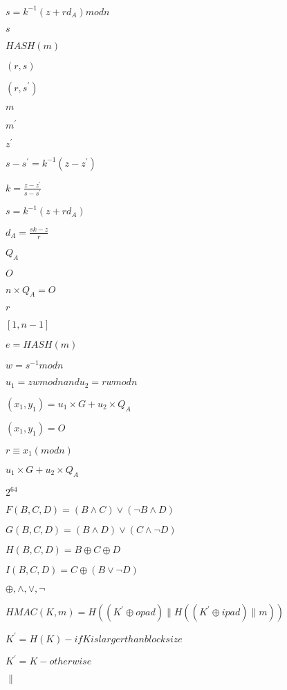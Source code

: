 \documentclass{article}
\begin{document}
$ s = {k}^{-1} ( z + rd_A ) mod n $
\pagebreak

$ s$
\pagebreak

$ HASH(m)$
\pagebreak

$ (r,s)$
\pagebreak

$ (r, {s}^{'})$
\pagebreak

$ m$
\pagebreak

$ {m}^{'}$
\pagebreak

$ {z}^{'}$
\pagebreak

$ s - {s}^{'} = {k}^{-1}(z - {z}^{'})$
\pagebreak

$ k = \frac{z - {z}^{'}}{s - {s}^{'}}$
\pagebreak

$ s = {k}^{-1}(z + rd_A)$
\pagebreak

$ d_A = \frac{sk - z}{r}$
\pagebreak

$ Q_A$
\pagebreak

$ O$
\pagebreak

$ n \times Q_A = O$
\pagebreak

$ r$
\pagebreak

$ [1, n - 1]$
\pagebreak

$ e = HASH (m)$
\pagebreak

$ w = {s}^{-1} mod n$
\pagebreak

$ u_1 = zw mod n and u_2 = rw mod n$
\pagebreak

$ (x_1, y_1) = u_1 \times G + u_2 \times Q_A$
\pagebreak

$ (x_1, y_1) = O$
\pagebreak

$ r \equiv x_1 ( mod n )$
\pagebreak

$ u_1 \times G + u_2 \times Q_A$
\pagebreak

$ {2}^{64} $
\pagebreak

$ F(B, C, D) = (B \wedge C) \vee (\neg B \wedge D) $
\pagebreak

$ G(B, C, D) = (B \wedge D) \vee (C \wedge \neg D) $
\pagebreak

$ H(B, C, D) = B \oplus C \oplus D $
\pagebreak

$ I(B, C, D) = C \oplus (B \vee \neg D) $
\pagebreak

$ \oplus, \wedge, \vee, \neg $
\pagebreak

$ HMAC(K,m) = H(({K}^{'}\oplus opad) \parallel H(({K}^{'}\oplus ipad) \parallel m)) $
\pagebreak

$ {K}^{'} = H(K) - if K is larger than block size$
\pagebreak

$ {K}^{'} = K - otherwise$
\pagebreak

$ \parallel$
\pagebreak
\end{document}
